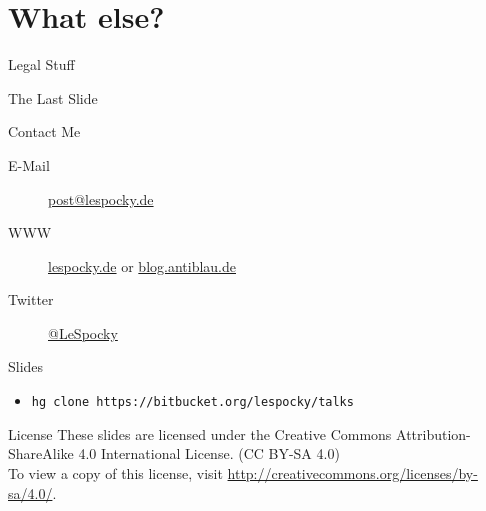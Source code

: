 \documentclass{beamer}
\begin{document}
%

\section*{What else?}

\begin{frame}{Legal Stuff}
\end{frame}

\begin{frame}{The Last Slide}
    \begin{block}{Contact Me}
        \begin{description}
            \item [E-Mail] \href{mailto:post@lespocky.de}{post@lespocky.de}
            \item [WWW] \href{http://www.lespocky.de/}{lespocky.de} or
                    \href{http://blog.antiblau.de/}{blog.antiblau.de}
            \item [Twitter] \href{https://twitter.com/LeSpocky}{@LeSpocky}
        \end{description}
    \end{block}
    \begin{block}{Slides}
        \begin{itemize}
            \item \texttt{hg clone https://bitbucket.org/lespocky/talks}
        \end{itemize}
    \end{block}
    \begin{block}{License}
        These slides are licensed under the Creative Commons
        Attribution-ShareAlike 4.0 International License. (CC BY-SA 4.0) \\
        To view a copy of this license, visit
        \url{http://creativecommons.org/licenses/by-sa/4.0/}.
    \end{block}
\end{frame}
\end{document}
